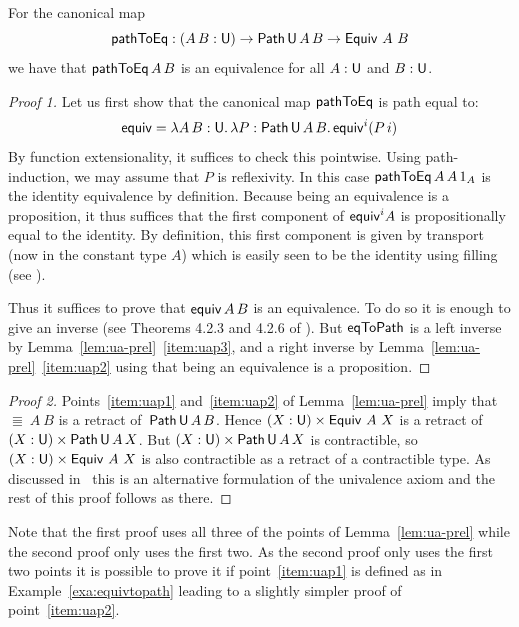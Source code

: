 \begin{corollary}
  \label{cor:ua}
  For the canonical map
  \[
  \mathsf{pathToEq} : (A \, B : \mathsf{U}) \to {\sf Path} \,\mathsf{U}\,A\,B \to {\sf Equiv}~A~B
  \]
  we have that $\mathsf{pathToEq} \, A \, B$ is an equivalence for
  all $A : \mathsf{U}$ and $B : \mathsf{U}$.
\end{corollary}
\begin{proof}[Proof 1]
  Let us first show that the canonical map $\mathsf{pathToEq}$ is path equal to:
  \[
  {\sf equiv} = \lambda A \, B : \mathsf{U}. \, \lambda P : {\sf Path}\,\mathsf{U}\,A\,B. \, {\sf equiv}^i (P\, i)
  \]
  By function extensionality, it suffices to check this pointwise.
  Using path-induction, we may assume that $P$ is reflexivity.  In
  this case $\mathsf{pathToEq}\,A\,A\,{1_{A}}$ is the identity equivalence by
  definition.  Because being an equivalence is a proposition, it thus
  suffices that the first component of ${\sf equiv}^i A$ is propositionally
  equal to the identity.  By definition, this first component is given
  by transport (now in the constant type $A$) which is easily seen to
  be the identity using filling (see ).

  Thus it suffices to prove that ${\sf equiv}\,A\,B$ is an equivalence.  To do
  so it is enough to give an inverse (see Theorems 4.2.3 and 4.2.6 of
  \cite{hott-book}). But $\operatorname{\mathsf{eqToPath}}$ is a left inverse by
  Lemma~\ref{lem:ua-prel}~\eqref{item:uap3}, and a right inverse by
  Lemma~\ref{lem:ua-prel}~\eqref{item:uap2} using that being an
  equivalence is a proposition.
\end{proof}
%
\begin{proof}[Proof 2]
  Points~\eqref{item:uap1} and~\eqref{item:uap2} of
  Lemma~\ref{lem:ua-prel} imply that~$\Equiv~A~B$ is a retract
  of~${\sf Path} \,\mathsf{U}\,A\,B$. Hence $(X : \mathsf{U}) \times {\sf Equiv}~A~X$ is a
  retract of $(X : \mathsf{U}) \times {\sf Path}\,\mathsf{U}\,A\,X$.  But $(X : \mathsf{U}) \times
  {\sf Path}\,\mathsf{U}\,A\,X$ is contractible, so $(X : \mathsf{U}) \times {\sf Equiv}~A~X$ is
  also contractible as a retract of a contractible type. As
  discussed in~ this is an alternative
  formulation of the univalence axiom and the rest of this proof
  follows as there.
\end{proof}

Note that the first proof uses all three of the points of
Lemma~\ref{lem:ua-prel} while the second proof only uses the first
two. As the second proof only uses the first two points it is possible
to prove it if point~\eqref{item:uap1} is defined as in
Example~\ref{exa:equivtopath} leading to a slightly simpler proof of
point~\eqref{item:uap2}.

